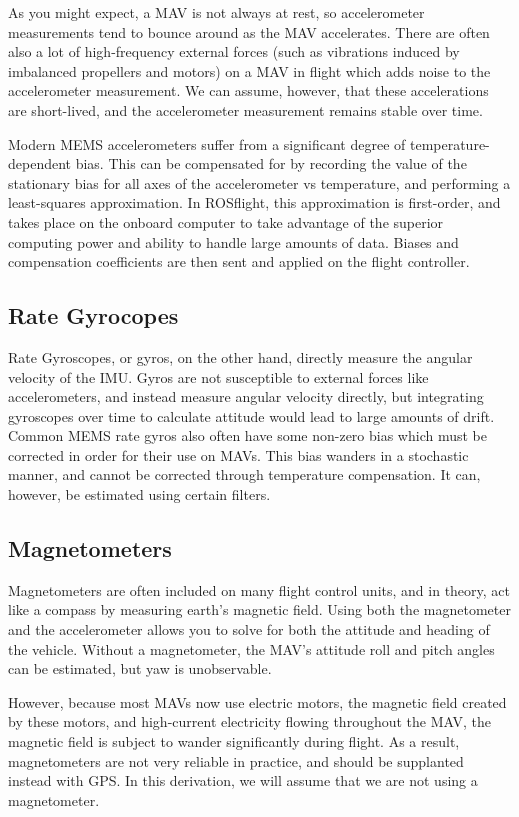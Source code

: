 \documentclass[paper=a4, fontsize=11pt]{scrartcl} %
\numberwithin{equation}{section} %
\numberwithin{figure}{section} %
\numberwithin{table}{section} %
\begin{document}
As you might expect, a MAV is not always at rest, so accelerometer measurements tend to bounce around as the MAV accelerates.  There are often also a lot of high-frequency external forces (such as vibrations induced by imbalanced propellers and motors) on a MAV in flight which adds noise to the accelerometer measurement.  We can assume, however, that these accelerations are short-lived, and the accelerometer measurement remains stable over time.

Modern MEMS accelerometers suffer from a significant degree of temperature-dependent bias.  This can be compensated for by recording the value of the stationary bias for all axes of the accelerometer vs temperature, and performing a least-squares approximation.  In ROSflight, this approximation is first-order, and takes place on the onboard computer to take advantage of the superior computing power and ability to handle large amounts of data.  Biases and compensation coefficients are then sent and applied on the flight controller.

\subsection{Rate Gyrocopes}

Rate Gyroscopes, or gyros, on the other hand, directly measure the angular velocity of the IMU.  Gyros are not susceptible to external forces like accelerometers, and instead measure angular velocity directly, but integrating gyroscopes over time to calculate attitude would lead to large amounts of drift.  Common MEMS rate gyros also often have some non-zero bias which must be corrected in order for their use on MAVs. This bias wanders in a stochastic manner, and cannot be corrected through temperature compensation.  It can, however, be estimated using certain filters.

\subsection{Magnetometers}

Magnetometers are often included on many flight control units, and in theory, act like a compass by measuring earth's magnetic field.  Using both the magnetometer and the accelerometer allows you to solve for both the attitude and heading of the vehicle.  Without a magnetometer, the MAV's attitude roll and pitch angles can be estimated, but yaw is unobservable.

However, because most MAVs now use electric motors, the magnetic field created by these motors, and high-current electricity flowing throughout the MAV, the magnetic field is subject to wander significantly during flight.  As a result, magnetometers are not very reliable in practice, and should be supplanted instead with GPS.  In this derivation, we will assume that we are not using a magnetometer.
\end{document}
